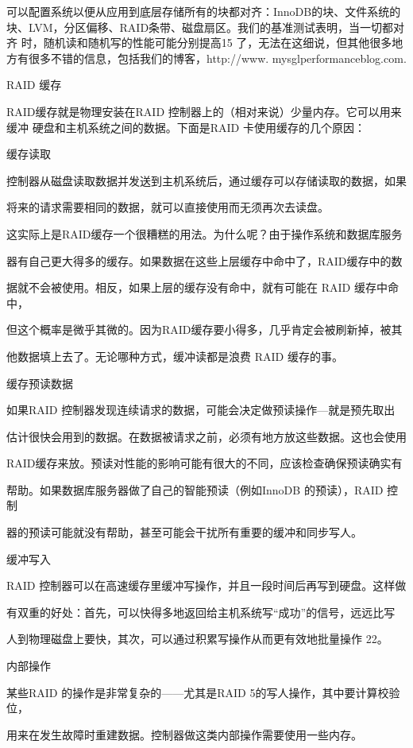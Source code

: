 可以配置系统以便从应用到底层存储所有的块都对齐：InnoDB的块、文件系统的
块、LVM，分区偏移、RAID条带、磁盘扇区。我们的基准测试表明，当一切都对齐
时，随机读和随机写的性能可能分别提高15%
了，无法在这细说，但其他很多地方有很多不错的信息，包括我们的博客，http://www.
mysglperformanceblog.com.

RAID 缓存

RAID缓存就是物理安装在RAID 控制器上的（相对来说）少量内存。它可以用来缓冲
硬盘和主机系统之间的数据。下面是RAID 卡使用缓存的几个原因：

缓存读取

控制器从磁盘读取数据并发送到主机系统后，通过缓存可以存储读取的数据，如果

将来的请求需要相同的数据，就可以直接使用而无须再次去读盘。

这实际上是RAID缓存一个很糟糕的用法。为什么呢？由于操作系统和数据库服务

器有自己更大得多的缓存。如果数据在这些上层缓存中命中了，RAID缓存中的数

据就不会被使用。相反，如果上层的缓存没有命中，就有可能在 RAID 缓存中命中，

但这个概率是微乎其微的。因为RAID缓存要小得多，几乎肯定会被刷新掉，被其

他数据填上去了。无论哪种方式，缓冲读都是浪费 RAID 缓存的事。

缓存预读数据

如果RAID 控制器发现连续请求的数据，可能会决定做预读操作—就是预先取出

估计很快会用到的数据。在数据被请求之前，必须有地方放这些数据。这也会使用

RAID缓存来放。预读对性能的影响可能有很大的不同，应该检查确保预读确实有

帮助。如果数据库服务器做了自己的智能预读（例如InnoDB 的预读），RAID 控制

器的预读可能就没有帮助，甚至可能会干扰所有重要的缓冲和同步写人。

缓冲写入

RAID 控制器可以在高速缓存里缓冲写操作，并且一段时间后再写到硬盘。这样做

有双重的好处：首先，可以快得多地返回给主机系统写“成功”的信号，远远比写

人到物理磁盘上要快，其次，可以通过积累写操作从而更有效地批量操作 22。

内部操作

某些RAID 的操作是非常复杂的——尤其是RAID 5的写人操作，其中要计算校验位，

用来在发生故障时重建数据。控制器做这类内部操作需要使用一些内存。


